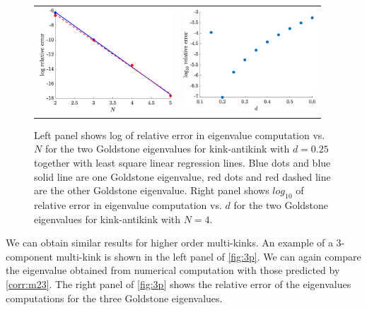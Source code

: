 \documentclass[12pt,reqno]{amsart}
\begin{document}
\begin{figure}[H]
	\begin{center}
	\begin{tabular}{cc}
	\includegraphics[width=5cm]{goldstoned025relerror.eps} &
	\includegraphics[width=5cm]{goldstoneN4relativeerror.eps}
	\end{tabular}
	\end{center}
	\caption{Left panel shows log of relative error in eigenvalue computation vs. $N$ for the two Goldstone eigenvalues for kink-antikink with $d = 0.25$ together with least square linear regression lines. Blue dots and blue solid line are one Goldstone eigenvalue, red dots and red dashed line are the other Goldstone eigenvalue. Right panel shows $log_{10}$ of relative error in eigenvalue computation vs. $d$ for the two Goldstone eigenvalues for kink-antikink with $N = 4$.} 
	\label{fig:kakeigerror}
\end{figure}

We can obtain similar results for higher order multi-kinks. An example of a 3-component multi-kink is shown in the left panel of \cref{fig:3p}. We can again compare the eigenvalue obtained from numerical computation with those predicted by \cref{corr:m23}. The right panel of \cref{fig:3p} shows the relative error of the eigenvalues computations for the three Goldstone eigenvalues.
\end{document}
